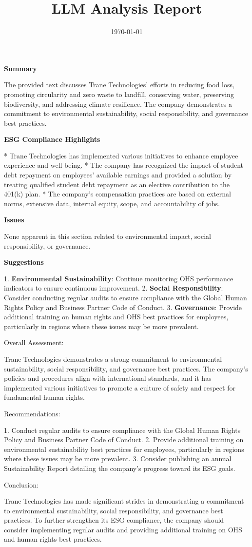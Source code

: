 \documentclass{article}
\title{LLM Analysis Report}
\date{\today}
\begin{document}
                \maketitle

                \textbf{Summary}

The provided text discusses Trane Technologies' efforts in reducing food loss, promoting circularity and zero waste to landfill, conserving water, preserving biodiversity, and addressing climate resilience. The company demonstrates a commitment to environmental sustainability, social responsibility, and governance best practices.

\textbf{ESG Compliance Highlights}

* Trane Technologies has implemented various initiatives to enhance employee experience and well-being.
* The company has recognized the impact of student debt repayment on employees' available earnings and provided a solution by treating qualified student debt repayment as an elective contribution to the 401(k) plan.
* The company's compensation practices are based on external norms, extensive data, internal equity, scope, and accountability of jobs.

\textbf{Issues}

None apparent in this section related to environmental impact, social responsibility, or governance.

\textbf{Suggestions}

1. \textbf{Environmental Sustainability}: Continue monitoring OHS performance indicators to ensure continuous improvement.
2. \textbf{Social Responsibility}: Consider conducting regular audits to ensure compliance with the Global Human Rights Policy and Business Partner Code of Conduct.
3. \textbf{Governance}: Provide additional training on human rights and OHS best practices for employees, particularly in regions where these issues may be more prevalent.

Overall Assessment:

Trane Technologies demonstrates a strong commitment to environmental sustainability, social responsibility, and governance best practices. The company's policies and procedures align with international standards, and it has implemented various initiatives to promote a culture of safety and respect for fundamental human rights.

Recommendations:

1. Conduct regular audits to ensure compliance with the Global Human Rights Policy and Business Partner Code of Conduct.
2. Provide additional training on environmental sustainability best practices for employees, particularly in regions where these issues may be more prevalent.
3. Consider publishing an annual Sustainability Report detailing the company's progress toward its ESG goals.

Conclusion:

Trane Technologies has made significant strides in demonstrating a commitment to environmental sustainability, social responsibility, and governance best practices. To further strengthen its ESG compliance, the company should consider implementing regular audits and providing additional training on OHS and human rights best practices.

                
\end{document}
